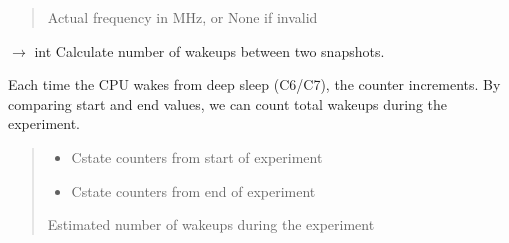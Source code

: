 \documentclass[letterpaper,10pt,english]{sphinxmanual}
\begin{document}
\begin{fulllineitems}
\begin{fulllineitems}
\begin{quote}
\begin{description}
\begin{itemize}
\end{itemize}

\sphinxAtStartPar
Actual frequency in MHz, or None if invalid

\end{description}\end{quote}

\end{fulllineitems}


\begin{fulllineitems}
\label{\detokenize{core.readers.msr_reader:core.readers.msr_reader.MSRReader.calculate_wakeup_delta}}
\pysigstartsignatures
\pysiglinewithargsret
{}
{\sphinxparamcomma {}}
{{ $\rightarrow$ int}}
\pysigstopsignatures
\sphinxAtStartPar
Calculate number of wakeups between two snapshots.

\sphinxAtStartPar
Each time the CPU wakes from deep sleep (C6/C7), the counter increments.
By comparing start and end values, we can count total wakeups during
the experiment.
\begin{quote}\begin{description}
\begin{itemize}
\item {} 
\sphinxAtStartPar
{} \textendash{} C\sphinxhyphen{}state counters from start of experiment

\item {} 
\sphinxAtStartPar
{} \textendash{} C\sphinxhyphen{}state counters from end of experiment

\end{itemize}

\sphinxAtStartPar
Estimated number of wakeups during the experiment

\end{description}\end{quote}


\end{fulllineitems}
\end{fulllineitems}
\end{document}
